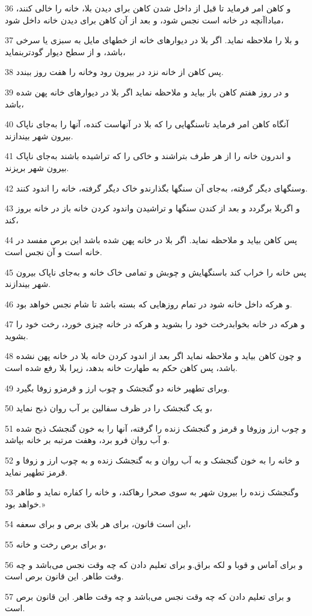 \par 36 و کاهن امر فرماید تا قبل از داخل شدن کاهن برای دیدن بلا، خانه را خالی کنند، مباداآنچه در خانه است نجس شود، و بعد از آن کاهن برای دیدن خانه داخل شود،
\par 37 و بلا را ملاحظه نماید. اگر بلا در دیوارهای خانه از خطهای مایل به سبزی یا سرخی باشد، و از سطح دیوار گودتربنماید،
\par 38 پس کاهن از خانه نزد در بیرون رود وخانه را هفت روز ببندد.
\par 39 و در روز هفتم کاهن باز بیاید و ملاحظه نماید اگر بلا در دیوارهای خانه پهن شده باشد،
\par 40 آنگاه کاهن امر فرماید تاسنگهایی را که بلا در آنهاست کنده، آنها را به‌جای ناپاک بیرون شهر بیندازند.
\par 41 و اندرون خانه را از هر طرف بتراشند و خاکی را که تراشیده باشند به‌جای ناپاک بیرون شهر بریزند.
\par 42 وسنگهای دیگر گرفته، به‌جای آن سنگها بگذارندو خاک دیگر گرفته، خانه را اندود کنند.
\par 43 و اگربلا برگردد و بعد از کندن سنگها و تراشیدن واندود کردن خانه باز در خانه بروز کند،
\par 44 پس کاهن بیاید و ملاحظه نماید. اگر بلا در خانه پهن شده باشد این برص مفسد در خانه است و آن نجس است.
\par 45 پس خانه را خراب کند باسنگهایش و چوبش و تمامی خاک خانه و به‌جای ناپاک بیرون شهر بیندازند.
\par 46 و هر‌که داخل خانه شود در تمام روزهایی که بسته باشد تا شام نجس خواهد بود.
\par 47 و هر‌که در خانه بخوابدرخت خود را بشوید و هر‌که در خانه چیزی خورد، رخت خود را بشوید.
\par 48 و چون کاهن بیاید و ملاحظه نماید اگر بعد از اندود کردن خانه بلا در خانه پهن نشده باشد، پس کاهن حکم به طهارت خانه بدهد، زیرا بلا رفع شده است.
\par 49 وبرای تطهیر خانه دو گنجشک و چوب ارز و قرمزو زوفا بگیرد.
\par 50 و یک گنجشک را در ظرف سفالین بر آب روان ذبح نماید،
\par 51 و چوب ارز وزوفا و قرمز و گنجشک زنده را گرفته، آنها را به خون گنجشک ذبح شده و آب روان فرو برد، وهفت مرتبه بر خانه بپاشد.
\par 52 و خانه را به خون گنجشک و به آب روان و به گنجشک زنده و به چوب ارز و زوفا و قرمز تطهیر نماید.
\par 53 وگنجشک زنده را بیرون شهر به سوی صحرا رهاکند، و خانه را کفاره نماید و طاهر خواهد بود.»
\par 54 این است قانون، برای هر بلای برص و برای سعفه،
\par 55 و برای برص رخت و خانه،
\par 56 و برای آماس و قوبا و لکه براق.و برای تعلیم دادن که چه وقت نجس می‌باشد و چه وقت طاهر. این قانون برص است.
\par 57 و برای تعلیم دادن که چه وقت نجس می‌باشد و چه وقت طاهر. این قانون برص است.
 
